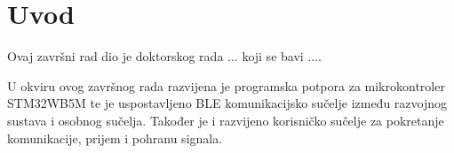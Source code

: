 \chapter{Uvod}


Ovaj završni rad dio je doktorskog rada ... koji se bavi .... 

U okviru ovog završnog rada razvijena je programska potpora za mikrokontroler STM32WB5M te je uspostavljeno BLE komunikacijsko sučelje između razvojnog sustava i osobnog sučelja. Također je i razvijeno korisničko sučelje za pokretanje komunikacije, prijem i pohranu signala.